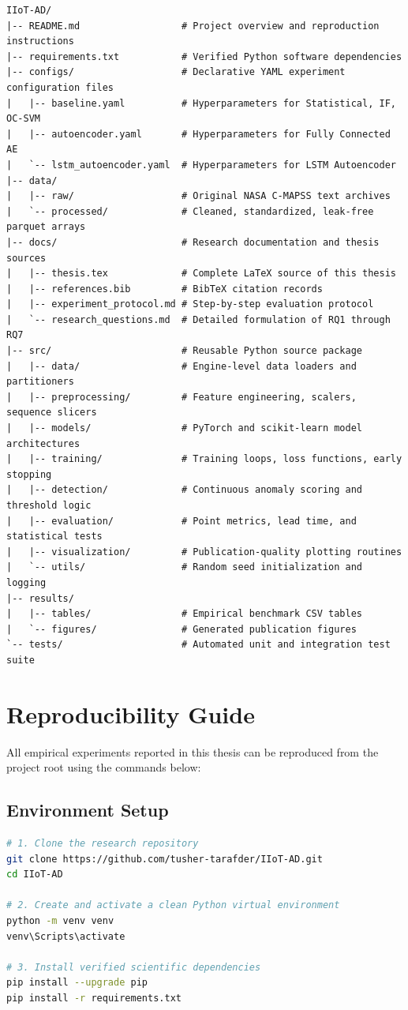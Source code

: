 \documentclass[12pt,a4paper,oneside]{report}
\begin{document}
\begin{lstlisting}
IIoT-AD/
|-- README.md                  # Project overview and reproduction instructions
|-- requirements.txt           # Verified Python software dependencies
|-- configs/                   # Declarative YAML experiment configuration files
|   |-- baseline.yaml          # Hyperparameters for Statistical, IF, OC-SVM
|   |-- autoencoder.yaml       # Hyperparameters for Fully Connected AE
|   `-- lstm_autoencoder.yaml  # Hyperparameters for LSTM Autoencoder
|-- data/
|   |-- raw/                   # Original NASA C-MAPSS text archives
|   `-- processed/             # Cleaned, standardized, leak-free parquet arrays
|-- docs/                      # Research documentation and thesis sources
|   |-- thesis.tex             # Complete LaTeX source of this thesis
|   |-- references.bib         # BibTeX citation records
|   |-- experiment_protocol.md # Step-by-step evaluation protocol
|   `-- research_questions.md  # Detailed formulation of RQ1 through RQ7
|-- src/                       # Reusable Python source package
|   |-- data/                  # Engine-level data loaders and partitioners
|   |-- preprocessing/         # Feature engineering, scalers, sequence slicers
|   |-- models/                # PyTorch and scikit-learn model architectures
|   |-- training/              # Training loops, loss functions, early stopping
|   |-- detection/             # Continuous anomaly scoring and threshold logic
|   |-- evaluation/            # Point metrics, lead time, and statistical tests
|   |-- visualization/         # Publication-quality plotting routines
|   `-- utils/                 # Random seed initialization and logging
|-- results/
|   |-- tables/                # Empirical benchmark CSV tables
|   `-- figures/               # Generated publication figures
`-- tests/                     # Automated unit and integration test suite
\end{lstlisting}

\chapter{Reproducibility Guide}
All empirical experiments reported in this thesis can be reproduced from the project root using the commands below:

\section{Environment Setup}
\begin{lstlisting}[language=bash]
# 1. Clone the research repository
git clone https://github.com/tusher-tarafder/IIoT-AD.git
cd IIoT-AD

# 2. Create and activate a clean Python virtual environment
python -m venv venv
venv\Scripts\activate

# 3. Install verified scientific dependencies
pip install --upgrade pip
pip install -r requirements.txt
\end{lstlisting}
\end{document}
